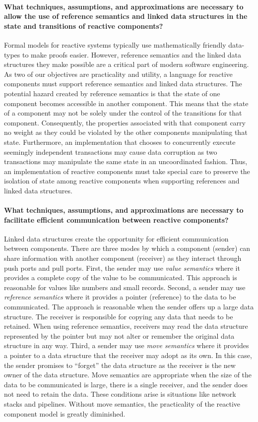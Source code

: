 \paragraph{What techniques, assumptions, and approximations are necessary to allow the use of reference semantics and linked data structures in the state and transitions of reactive components?}
Formal models for reactive systems typically use mathematically friendly data-types to make proofs easier.
However, reference semantics and the linked data structures they make possible are a critical part of modern software engineering.
As two of our objectives are practicality and utility, a language for reactive components must support reference semantics and linked data structures.
The potential hazard created by reference semantics is that the state of one component becomes accessible in another component.
This means that the state of a component may not be solely under the control of the transitions for that component.
Consequently, the properties associated with that component carry no weight as they could be violated by the other components manipulating that state.
Furthermore, an implementation that chooses to concurrently execute seemingly independent transactions may cause data corruption as two transactions may manipulate the same state in an uncoordinated fashion.
Thus, an implementation of reactive components must take special care to preserve the isolation of state among reactive components when supporting references and linked data structures.

\paragraph{What techniques, assumptions, and approximations are necessary to facilitate efficient communication between reactive components?}
Linked data structures create the opportunity for efficient communication between components.
There are three modes by which a component (sender) can share information with another component (receiver) as they interact through push ports and pull ports.
First, the sender may use \emph{value semantics} where it provides a complete copy of the value to be communicated.
This approach is reasonable for values like numbers and small records.
Second, a sender may use \emph{reference semantics} where it provides a pointer (reference) to the data to be communicated.
The approach is reasonable when the sender offers up a large data structure.
The receiver is responsible for copying any data that needs to be retained.
When using reference semantics, receivers may read the data structure represented by the pointer but may not alter or remember the original data structure in any way.
Third, a sender may use \emph{move semantics} where it provides a pointer to a data structure that the receiver may adopt as its own.
In this case, the sender promises to ``forget'' the data structure as the receiver is the new owner of the data structure.
Move semantics are appropriate when the size of the data to be communicated is large, there is a single receiver, and the sender does not need to retain the data.
These conditions arise is situations like network stacks and pipelines.
Without move semantics, the practicality of the reactive component model is greatly diminished.


